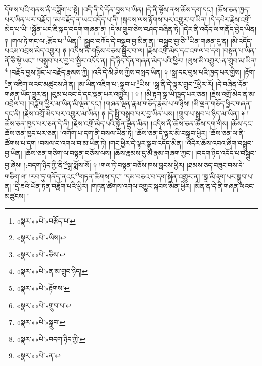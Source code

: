 དོགས་པའི་གནས་ནི་བཟློག་པ་སྟེ། །འདི་ནི་དེ་དོན་བྱས་པ་ཡིན། །དེ་ནི་ལྟོས་ནས་ཆོས་དག་དང་། །ཆོས་ཅན་ཁྱད་པར་ཡིན་པར་བརྗོད། །མ་བརྗོད་ན་ཡང་འདོད་པ་ནི། །སྐབས་ལས་རྟོགས་པར་འགྱུར་བ་ཡིན། །དེ་དཔེར་རྗེས་འགྲོ་མེད་པ་ཡི། །སྐྱོན་ཡང་ཇི་སྐད་བདག་གཞན་ན། །དེ་མ་གྲུབ་ཅེས་བཤད་བཞིན་ཏེ། །དེར་ནི་འདོད་ལ་གནོད་བྱེད་ཡིན། ༈ །གལ་ཏེ་གང་ལ་:རྩོད་པ་\footnote{«སྣར་»«པེ་»བརྩོད་པ་}ཡིན།\footnote{«སྣར་»«པེ་»ཡིས།} །སྒྲུབ་བཀོད་དེ་བསྒྲུབ་བྱ་མིན་ན། །བསྒྲུབ་བྱ་ཅི་\footnote{«སྣར་»«པེ་»ཅིས་}ཡིན་གཞན་དུ་ན། །མི་འདོད་པའམ་འབྲས་མེད་འགྱུར། ༈ །འདིས་ནི་གཉིས་བཅས་སྦྱོར་བ་ལ། །རྗེས་འགྲོ་མེད་དང་འགལ་བ་དག །བསྟན་པ་ཡིན་ནོ་ཅི་སྟེ་ཡང་། །བསྒྲུབ་པར་བྱ་བ་སྤྱིར་འདོད་ན། །དེ་ཉིད་དོན་གཞན་མེད་པའི་ཕྱིར། །ལུས་མི་འགྱུར་:ན་གྲུབ་མ་ཡིན།\footnote{«སྣར་»«པེ་»ན་མ་གྲུབ་ཉིད།} །བརྗོད་བྱས་སྟོང་པ་བརྗོད་རྣམས་ཀྱི། །འདི་དེ་མི་ཤེས་ཀྱིས་བསླད་ཡིན། ༈ །སྒྲ་དང་བུམ་པའི་ཁྱད་པར་གྱིས། །རྟོག་\footnote{«སྣར་»«པེ་»རྟོགས་}ན་འཇིག་ལའང་མཚུངས་ཤེ་ན། །མ་ཡིན་འཇིག་པ་:སྒྲུབ་པ་\footnote{«སྣར་»«པེ་»གྲུབ་པ་}ཡིས། །སྒྲ་ནི་དེ་ལྟར་གྲུབ་\footnote{«སྣར་»«པེ་»སྒྲུབ་}ཕྱིར་རོ། །དེ་བཞིན་དོན་གཞན་ཡོད་གྱུར་ན། །བུམ་པའང་དེ་དང་ལྡན་པར་འགྱུར། ། ༈ ། །མི་རྟག་སྒྲ་ཡི་ཁྱད་པར་ཅན། །རྗེས་འགྲོ་མེད་ན་མ་འབྲེལ་བ། །བཟློག་ཕྱིར་མ་ཡིན་མི་ལྡན་དང་། །གཞན་ལྡན་རྣམ་གཅོད་རྣམ་པ་གཉིས། །མི་ལྡན་གཅོད་ཕྱིར་གཞན་དང་ནི། །རྗེས་འགྲོ་མེད་པར་འགྱུར་མ་ཡིན། ༈ །དེ་སྤྱི་བསྒྲུབ་པར་བྱ་ཡིན་པས། །གྲུབ་པ་སྒྲུབ་པ་ཉིད་མ་ཡིན། ༈ །ཆོས་ཅན་ཁྱད་པར་ཅན་དེ་ནི། །རྗེས་འགྲོ་མེད་པའི་སྐྱོན་ལྡན་མིན། །འདིས་ནི་ཆོས་ཅན་ཆོས་དག་གིས། །ཆོས་དང་ཆོས་ཅན་ཁྱད་པར་ཅན། །འགོག་པ་དག་ནི་བསལ་ཡིན་ཏེ། །ཆོས་ཅན་དེ་ལྟར་མི་བསྒྲུབ་ཕྱིར། །ཆོས་ཅན་ལ་ནི་ཚོགས་པ་དག །བསལ་བ་འགལ་བ་མ་ཡིན་ཏེ། །གང་ཕྱིར་དེ་ལྟར་སྒྲུབ་འདོད་མིན། །འདིར་ཆོས་འབའ་ཞིག་བསྒྲུབ་བྱ་ཡིན། །ཆོས་ཅན་གཅིག་ལ་བསྟན་བཅོས་ལས། །ཆོས་རྣམས་དུ་མ་རྣམ་གཞག་ཀྱང་། །བདག་ཉིད་འདོད་པ་བསྒྲུབ་བྱ་ཞེས། །:བདག་ཉིད་ཀྱི་ནི་\footnote{«སྣར་»«པེ་»བདག་ཉིད་ཀྱི་}སྒྲ་སྨོས་སོ། ༈ །གལ་ཏེ་བསྟན་བཅོས་ཁས་བླངས་ཕྱིར། །ཐམས་ཅད་བཟུང་བས་དེ་གཅིག་ལ། །རབ་ཏུ་གནོད་ནའང་\footnote{«སྣར་»«པེ་»ན་}གཏན་ཚིགས་དང་། །དམ་བཅའ་བ་དག་སྐྱོན་འགྱུར་ན། །སྒྲ་མི་རྟག་པར་སྒྲུབ་པ་ན། །དྲི་ཟའི་ཡོན་ཏན་བཟློག་པའི་ཕྱིར། །གཏན་ཚིགས་འགལ་འགྱུར་སྐབས་མིན་ཕྱིར། །མིན་ན་དེ་ནི་གཞན་ལའང་མཚུངས། །
